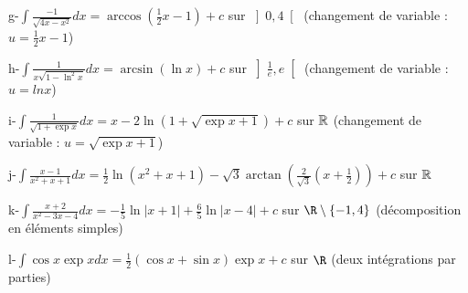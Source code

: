 {{g-$\int \frac{-1}{\sqrt{4x-x^2}}dx=\arccos \left( \frac 12x-1\right) +c$ sur 
$\left] 0,4\right[ $ (changement de variable : $u=\frac 12x-1$)

h-$\int \frac 1{x\sqrt{1-\ln ^2x}}dx=\arcsin \left( \ln x\right) +c$ sur $%
\left] \frac 1e,e\right[ $ (changement de variable : $u=lnx$)

i-$\int \frac 1{\sqrt{1+\exp x}}dx=x-2\ln \left( 1+\sqrt{\exp x+1}\right) +c$
sur $\Bbb{R}$ (changement de variable : $u=\sqrt{\exp x+1}$)

j-$\int \frac{x-1}{x^2+x+1}dx=\frac 12\ln \left( x^2+x+1\right) -\sqrt{3}%
\arctan \left( \frac 2{\sqrt{3}}\left( x+\frac 12\right) \right) +c$ sur $%
\Bbb{R}$

k-$\int \frac{x+2}{x^2-3x-4}dx=-\frac 15\ln \left| x+1\right| +\frac 65\ln
\left| x-4\right| +c$ sur $\R\setminus\left\{
-1,4\right\} $ (d\'ecomposition en \'el\'ements simples)

l-$\int \cos x\exp xdx=\frac 12\left( \cos x+\sin x\right) \exp x+c$ sur $%
\R$ (deux int\'egrations par parties)
}
}
